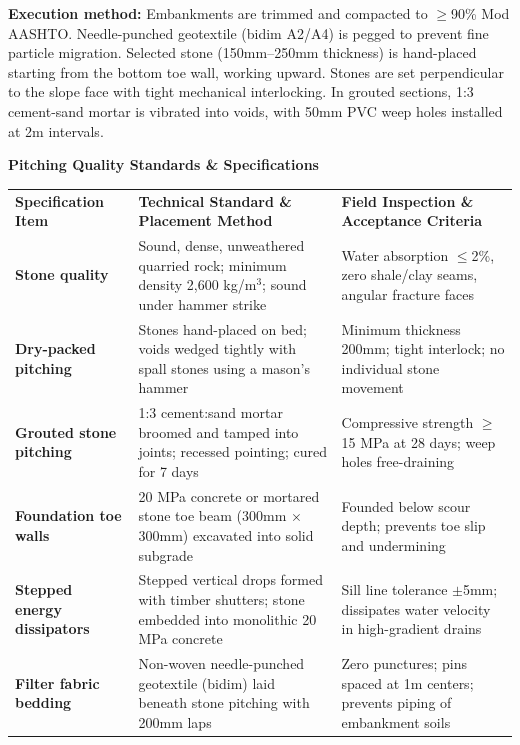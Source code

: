 \documentclass[a4paper,11pt]{article}
\begin{document}
\vspace{0.20cm}

\noindent
\begin{tcolorbox}[enhanced, colback=mhoffwhite, colframe=mhlightgray, boxrule=0.7pt, arc=4pt, left=9pt, right=9pt, top=7pt, bottom=7pt, borderline west={3pt}{0pt}{mhgold}, drop shadow=black!4]
    {\fontsize{8.1pt}{11.0pt}\selectfont\color{mhtext}
    \textbf{Execution method:} Embankments are trimmed and compacted to $\ge$90\% Mod AASHTO. Needle-punched geotextile (bidim A2/A4) is pegged to prevent fine particle migration. Selected stone (150mm--250mm thickness) is hand-placed starting from the bottom toe wall, working upward. Stones are set perpendicular to the slope face with tight mechanical interlocking. In grouted sections, 1:3 cement-sand mortar is vibrated into voids, with 50mm PVC weep holes installed at 2m intervals.
    }
\end{tcolorbox}

\vfill

\noindent
{\large\bfseries\color{mhnavy} Pitching Quality Standards \& Specifications}
\vspace{0.10cm}

{\fontsize{7.7pt}{9.8pt}\selectfont
\renewcommand{\arraystretch}{1.23}
\noindent
\begin{tabularx}{\textwidth}{@{}p{3.3cm} p{6.6cm} X@{}}
\rowcolor{mhnavy}
{\color{white}\bfseries Specification Item} & {\color{white}\bfseries Technical Standard \& Placement Method} & {\color{white}\bfseries Field Inspection \& Acceptance Criteria} \\
\rowcolor{mhbluelight}
\bfseries Stone quality & Sound, dense, unweathered quarried rock; minimum density 2,600 kg/m$^3$; sound under hammer strike & Water absorption $\le$2\%, zero shale/clay seams, angular fracture faces \\
\bfseries Dry-packed pitching & Stones hand-placed on bed; voids wedged tightly with spall stones using a mason's hammer & Minimum thickness 200mm; tight interlock; no individual stone movement \\
\rowcolor{mhbluelight}
\bfseries Grouted stone pitching & 1:3 cement:sand mortar broomed and tamped into joints; recessed pointing; cured for 7 days & Compressive strength $\ge$15 MPa at 28 days; weep holes free-draining \\
\bfseries Foundation toe walls & 20 MPa concrete or mortared stone toe beam (300mm $\times$ 300mm) excavated into solid subgrade & Founded below scour depth; prevents toe slip and undermining \\
\rowcolor{mhbluelight}
\bfseries Stepped energy dissipators & Stepped vertical drops formed with timber shutters; stone embedded into monolithic 20 MPa concrete & Sill line tolerance $\pm$5mm; dissipates water velocity in high-gradient drains \\
\bfseries Filter fabric bedding & Non-woven needle-punched geotextile (bidim) laid beneath stone pitching with 200mm laps & Zero punctures; pins spaced at 1m centers; prevents piping of embankment soils \\
\end{tabularx}
\renewcommand{\arraystretch}{1}
}
\end{document}
